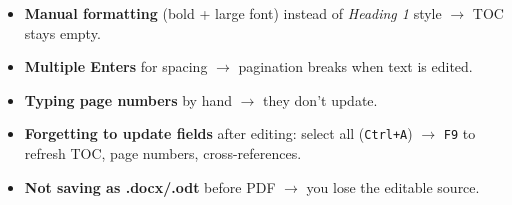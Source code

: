 \documentclass[11pt]{article}
\begin{document}
\begin{attention}
\begin{itemize}
\item \textbf{Manual formatting} (bold + large font) instead of \emph{Heading 1} style $\rightarrow$ TOC stays empty.
\item \textbf{Multiple Enters} for spacing $\rightarrow$ pagination breaks when text is edited.
\item \textbf{Typing page numbers} by hand $\rightarrow$ they don't update.
\item \textbf{Forgetting to update fields} after editing: select all (\texttt{Ctrl+A}) $\rightarrow$ \texttt{F9} to refresh TOC, page numbers, cross-references.
\item \textbf{Not saving as .docx/.odt} before PDF $\rightarrow$ you lose the editable source.
\end{itemize}
\end{attention}
\end{document}
